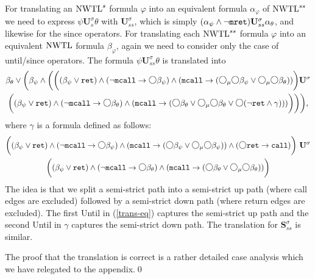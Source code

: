 \documentclass{LMCS}
\newcommand{\M}{{\mu}}
\newcommand{\dm}{\Diamond}
\newcommand{\aProof}[2]{\vspace{2mm}{\noindent\em Proof of
#1.~}#2\qed}
\newcommand{\U}{{\mathbf U}}
\renewcommand{\S}{{\mathbf S}}
\newcommand{\next}{\text{\raisebox{1pt}{$\bigcirc$}}}
\renewcommand{\phi}{\varphi}
\theoremstyle{plain}
\theoremstyle{definition}
\newcommand{\ppath}{\sigma} \newcommand{\Ul}{\U}
\newcommand{\Up}{\U^\ppath}
\newcommand{\Sp}{\S^\ppath}
\newcommand{\Us}{\Up_s}
\newcommand{\Uss}{\Up_{ss}}
\newcommand{\Sss}{\Sp_{ss}}
\newcommand{\mret}{{\tt{mret}}}
\newcommand{\mcall}{{\tt{mcall}}}
\newcommand{\nwtls}{\nwtl^s}
\newcommand{\nwtlss}{\nwtl^{ss}}
\newcommand{\rett}{{\tt ret}}
\newcommand{\call}{{\tt call}}
\newcommand{\dmm}{\dm_{\M}}
\renewcommand{\dm}{\next}
\renewcommand{\dmm}{\dm_\M}
\begin{document}
\aProof{Lemma \ref{nwtl-lemma-one}}{For translating an  $\nwtls$
formula $\phi$ into an equivalent formula $\alpha_\phi$ of $\nwtlss$
we need to express $\psi \Us \theta$ with $\Uss$, which is simply
$(\alpha_\psi \wedge \neg\mret) \Uss \alpha_\theta$, and likewise for
the since operators. For translating each $\nwtlss$ formula $\phi$
into an equivalent $\text{\rm NWTL}$ formula $\beta_\phi$, again we need to consider
only the case of until/since operators. The formula $\psi \Uss \theta$ is
translated into
{\small
\begin{multline}
\label{trans-eq}
{\beta_\theta \vee \bigg(\beta_\psi \wedge \bigg(\bigg((\beta_\psi \vee
\rett) \wedge (\neg \mcall \to \dm \beta_\psi) \wedge (\mcall \to (\dmm
\dm \beta_\psi \vee \dmm \dm \beta_\theta))\bigg) \Up} \\ 
{\bigg((\beta_\psi \vee \rett) \wedge (\neg \mcall \to \dm \beta_\theta)
\wedge (\mcall \to (\dm \beta_\theta \vee \dmm \dm \beta_\theta \vee
\dm (\neg \rett \wedge \gamma)))\bigg)\bigg)\bigg),}
\end{multline}
where $\gamma$ is a formula defined as follows:
\begin{multline*}
{\bigg((\beta_\psi \vee
\rett) \wedge (\neg \mcall \to \dm \beta_\psi) \wedge (\mcall \to (\dm
\beta_\psi \vee \dmm \dm \beta_\psi)) \wedge (\dm \rett \to
\call) \bigg)\ \Up}\\ 
{\bigg((\beta_\psi \vee \rett) \wedge (\neg\mcall \to \dm \beta_\theta)
\wedge (\mcall \to (\dm \beta_\theta \vee \dmm  \dm  \beta_\theta))\bigg)}
\end{multline*}
}
The idea is that we split a semi-strict path into a semi-strict up
path (where call edges are excluded) followed by a semi-strict down
path (where return edges are excluded).  The first Until in
(\ref{trans-eq}) captures the semi-strict up path and the second Until
in $\gamma$ captures the semi-strict down path.
The translation for $\Sss$ is similar. 

The proof that the translation is correct is a rather detailed case
analysis which we have relegated to the appendix.}
\end{document}
